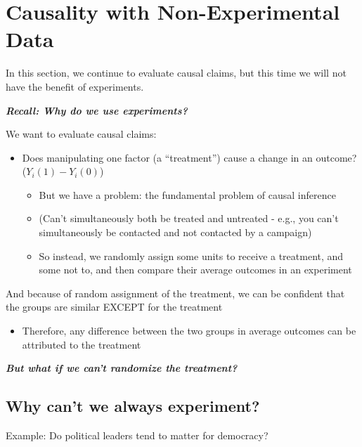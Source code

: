 \documentclass[
  letterpaper,
  DIV=11,
  numbers=noendperiod]{scrreprt}
\providecommand{\tightlist}{%
  \setlength{\itemsep}{0pt}\setlength{\parskip}{0pt}}\usepackage{longtable,booktabs,array}
\begin{document}

\hypertarget{causalityii}{%
\chapter{Causality with Non-Experimental Data}\label{causalityii}}

In this section, we continue to evaluate causal claims, but this time we
will not have the benefit of experiments.

\textbf{\emph{Recall: Why do we use experiments?}}

We want to evaluate causal claims:

\begin{itemize}
\tightlist
\item
  Does manipulating one factor (a ``treatment'') cause a change in an
  outcome? (\(Y_i(1) - Y_i(0)\))

  \begin{itemize}
  \tightlist
  \item
    But we have a problem: the fundamental problem of causal inference
  \item
    (Can't simultaneously both be treated and untreated - e.g., you
    can't simultaneously be contacted and not contacted by a campaign)
  \item
    So instead, we randomly assign some units to receive a treatment,
    and some not to, and then compare their average outcomes in an
    experiment
  \end{itemize}
\end{itemize}

And because of random assignment of the treatment, we can be confident
that the groups are similar EXCEPT for the treatment

\begin{itemize}
\tightlist
\item
  Therefore, any difference between the two groups in average outcomes
  can be attributed to the treatment
\end{itemize}

\textbf{\emph{But what if we can't randomize the treatment?}}

\hypertarget{why-cant-we-always-experiment}{%
\section{Why can't we always
experiment?}\label{why-cant-we-always-experiment}}

Example: Do political leaders tend to matter for democracy?
\end{document}
